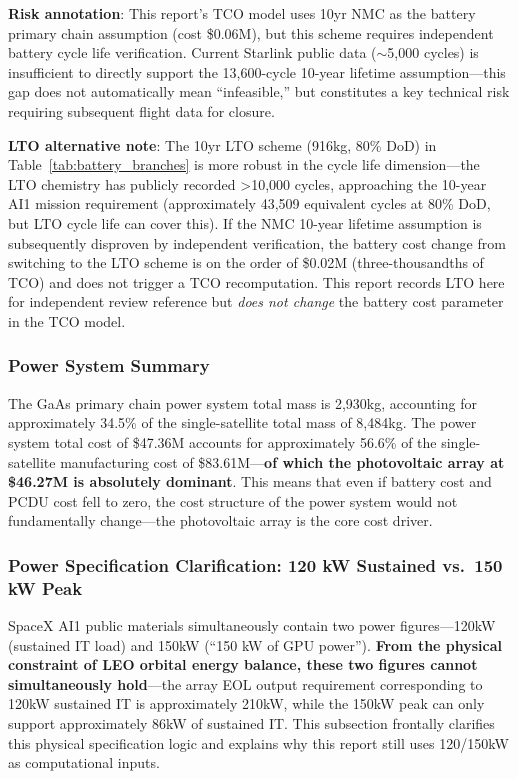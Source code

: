 \smallskip
\noindent\textbf{Risk annotation}: This report's TCO model uses 10yr NMC as the battery primary chain assumption (cost \$0.06M), but this scheme requires independent battery cycle life verification. Current Starlink public data ($\sim$5,000 cycles) is insufficient to directly support the 13,600-cycle 10-year lifetime assumption---this gap does not automatically mean ``infeasible,'' but constitutes a key technical risk requiring subsequent flight data for closure.

\smallskip
\noindent\textbf{LTO alternative note}: The 10yr LTO scheme (916\;kg, 80\% DoD) in Table~\ref{tab:battery_branches} is more robust in the cycle life dimension---the LTO chemistry has publicly recorded >10,000 cycles, approaching the 10-year AI1 mission requirement (approximately 43,509 equivalent cycles at 80\% DoD, but LTO cycle life can cover this). If the NMC 10-year lifetime assumption is subsequently disproven by independent verification, the battery cost change from switching to the LTO scheme is on the order of \$0.02M (three-thousandths of TCO) and does not trigger a TCO recomputation. This report records LTO here for independent review reference but \emph{does not change} the battery cost parameter in the TCO model.

\subsubsection{Power System Summary}

The GaAs primary chain power system total mass is 2,930\;kg, accounting for approximately 34.5\% of the single-satellite total mass of 8,484\;kg. The power system total cost of \$47.36M accounts for approximately 56.6\% of the single-satellite manufacturing cost of \$83.61M---\textbf{of which the photovoltaic array at \$46.27M is absolutely dominant}. This means that even if battery cost and PCDU cost fell to zero, the cost structure of the power system would not fundamentally change---the photovoltaic array is the core cost driver.

\subsubsection{Power Specification Clarification: 120 kW Sustained vs.\ 150 kW Peak}

SpaceX AI1 public materials simultaneously contain two power figures---120\;kW (sustained IT load) and 150\;kW (``150 kW of GPU power''). \textbf{From the physical constraint of LEO orbital energy balance, these two figures cannot simultaneously hold}---the array EOL output requirement corresponding to 120\;kW sustained IT is approximately 210\;kW, while the 150\;kW peak can only support approximately 86\;kW of sustained IT. This subsection frontally clarifies this physical specification logic and explains why this report still uses 120/150\;kW as computational inputs.

